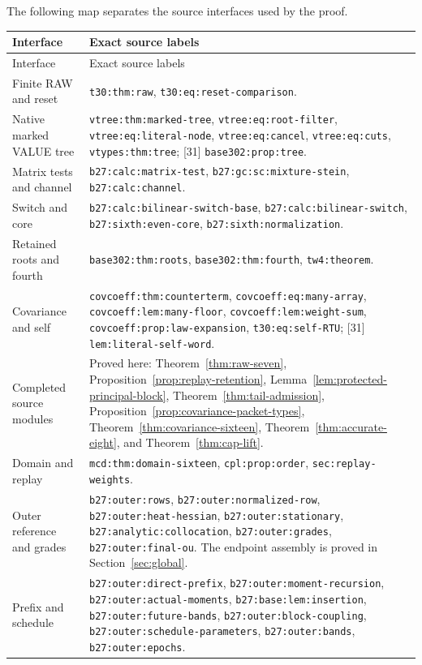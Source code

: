 \documentclass[11pt]{article}
\numberwithin{equation}{section}
\theoremstyle{remark}\newtheorem{remark}[theorem]{Remark}
\newcommand{\src}[1]{\texttt{\nolinkurl{#1}}}
\begin{document}
The following map separates the source interfaces used by the proof.
\begin{longtable}{>{\raggedright\arraybackslash}p{}>{\raggedright\arraybackslash}p{}}
\toprule
Interface & Exact source labels\\
\midrule\endfirsthead
\toprule Interface & Exact source labels\\\midrule\endhead
Finite RAW and reset & [30] \src{t30:thm:raw}, \src{t30:eq:reset-comparison}.\\[4pt]
Native marked VALUE tree & [30] \src{vtree:thm:marked-tree}, \src{vtree:eq:root-filter}, \src{vtree:eq:literal-node}, \src{vtree:eq:cancel}, \src{vtree:eq:cuts}, \src{vtypes:thm:tree}; [31] \src{base302:prop:tree}.\\[4pt]
Matrix tests and channel & [30] \src{b27:calc:matrix-test}, \src{b27:gc:sc:mixture-stein}, \src{b27:calc:channel}.\\[4pt]
Switch and core & [30] \src{b27:calc:bilinear-switch-base}, \src{b27:calc:bilinear-switch}, \src{b27:sixth:even-core}, \src{b27:sixth:normalization}.\\[4pt]
Retained roots and fourth & [31] \src{base302:thm:roots}, \src{base302:thm:fourth}, \src{tw4:theorem}.\\[4pt]
Covariance and self & [30] \src{covcoeff:thm:counterterm}, \src{covcoeff:eq:many-array}, \src{covcoeff:lem:many-floor}, \src{covcoeff:lem:weight-sum}, \src{covcoeff:prop:law-expansion}, \src{t30:eq:self-RTU}; [31] \src{lem:literal-self-word}.\\[4pt]
Completed source modules & Proved here: Theorem~\ref{thm:raw-seven}, Proposition~\ref{prop:replay-retention}, Lemma~\ref{lem:protected-principal-block}, Theorem~\ref{thm:tail-admission}, Proposition~\ref{prop:covariance-packet-types}, Theorem~\ref{thm:covariance-sixteen}, Theorem~\ref{thm:accurate-eight}, and Theorem~\ref{thm:cap-lift}.\\[4pt]
Domain and replay & [31] \src{mcd:thm:domain-sixteen}, \src{cpl:prop:order}, \src{sec:replay-weights}.\\[4pt]
Outer reference and grades & [30] \src{b27:outer:rows}, \src{b27:outer:normalized-row}, \src{b27:outer:heat-hessian}, \src{b27:outer:stationary}, \src{b27:analytic:collocation}, \src{b27:outer:grades}, \src{b27:outer:final-ou}. The endpoint assembly is proved in Section~\ref{sec:global}.\\[4pt]
Prefix and schedule & [30] \src{b27:outer:direct-prefix}, \src{b27:outer:moment-recursion}, \src{b27:outer:actual-moments}, \src{b27:base:lem:insertion}, \src{b27:outer:future-bands}, \src{b27:outer:block-coupling}, \src{b27:outer:schedule-parameters}, \src{b27:outer:bands}, \src{b27:outer:epochs}.\\
\bottomrule
\end{longtable}
\end{document}
